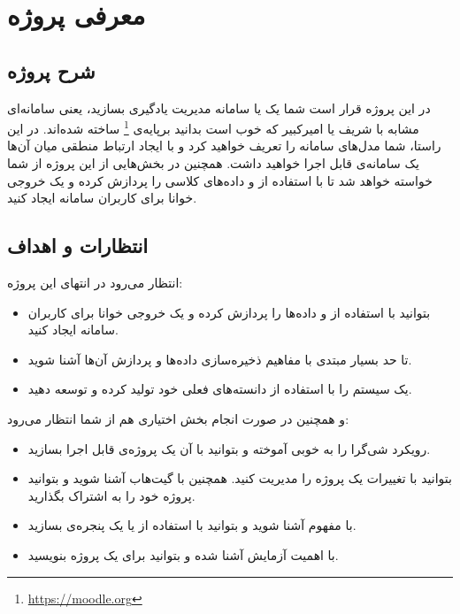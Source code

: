 \chapter{معرفی پروژه}
\section{شرح پروژه}

در این پروژه قرار است شما یک  یا سامانه مدیریت یادگیری بسازید، یعنی سامانه‌ای مشابه با  شریف یا  امیرکبیر که خوب است بدانید برپایه‌ی \footnote{\href{https://moodle.org}{\url{https://moodle.org}}} ساخته شده‌اند. 
در این راستا، شما مدل‌های سامانه را تعریف خواهید کرد و با ایجاد ارتباط منطقی میان آن‌ها یک سامانه‌ی قابل اجرا خواهید داشت. همچنین در بخش‌هایی از این پروژه از شما خواسته خواهد شد تا با استفاده از  و  داده‌های کلاسی را پردازش کرده و یک خروجی خوانا برای کاربران سامانه ایجاد کنید.

\section{انتظارات و اهداف}

انتظار می‌رود در انتهای این پروژه:

\begin{itemize}
    \item {
        بتوانید با استفاده از  و  داده‌ها را پردازش کرده و یک خروجی خوانا برای کاربران سامانه ایجاد کنید.
    }
    \item {
        تا حد بسیار مبتدی با مفاهیم ذخیره‌سازی داده‌ها و پردازش آن‌ها آشنا شوید.
    }
    \item {
        یک سیستم را با استفاده از دانسته‌های فعلی خود تولید کرده و توسعه دهید.
    }
\end{itemize}
\noindent
و همچنین در صورت انجام بخش اختیاری هم از شما انتظار می‌رود:

\begin{itemize}
    \item {
        رویکرد شی‌گرا را به خوبی آموخته و بتوانید با آن یک پروژه‌ی قابل اجرا بسازید.
    }
    \item {
        بتوانید با  تغییرات یک پروژه را مدیریت کنید. همچنین با گیت‌هاب آشنا شوید و بتوانید پروژه خود را به اشتراک بگذارید.
    }
    \item {
        با مفهوم  آشنا شوید و بتوانید با استفاده از  یا  یک پنجره‌ی  بسازید.
    }
    \item {
        با اهمیت آزمایش آشنا شده و بتوانید برای یک پروژه  بنویسید.
    }
\end{itemize}


